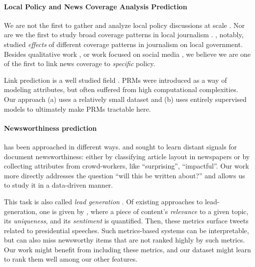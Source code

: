 \documentclass[11pt]{article}
\begin{document}
\paragraph{Local Policy and News Coverage Analysis Prediction} We are not the first to gather and analyze local policy discussions at scale \cite{sorens2008us, brown2021council, maxfield2022councils, barari2023localview}. Nor are we the first to study broad coverage patterns in local journalism \cite{hamilton2016democracy, baekgaard2014local, garz2017politicians}. , notably, studied \textit{effects} of different coverage patterns in journalism on local government. Besides qualitative work \cite{felt2015incessant}, or work focused on social media \cite{graham2015role}, we believe we are one of the first to link news coverage to \textit{specific} policy. 

Link prediction is a well studied field \cite{kumar2020link}. PRMs were introduced \cite{getoor2002learning, taskar2003link} as a way of modeling attributes, but often suffered from high computational complexities. Our approach (a) uses a relatively small dataset and (b) uses entirely supervised models to ultimately make PRMs tractable here.

\paragraph{Newsworthiness prediction} has been approached in different ways. \cite{spangher2021modeling} and \cite{nishal2022crowd} sought to learn distant signals for document newsworthiness: either by classifying article layout in newspapers or by collecting attributes from crowd-workers, like ``surprising'', ``impactful''. Our work more directly addresses the question ``will this be written about?'' and allows us to study it in a data-driven manner.

This task is also called \textit{lead generation} \cite{cohen2011computational}. Of existing approaches to lead-generation, one is given by \citet{diakopoulos2010diamonds}, where a piece of content's \textit{relevance} to a given topic, its \textit{uniqueness}, and its \textit{sentiment} is quantified. Then, these metrics surface tweets related to presidential speeches. Such metrics-based systems can be interpretable, but can also miss newsworthy items that are not ranked highly by such metrics. Our work might benefit from including these metrics, and our dataset might learn to rank them well among our other features.
\end{document}
